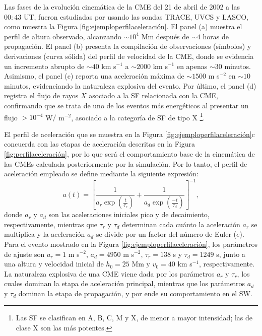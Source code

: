 Las fases de la evolución cinemática de la CME del 21 de abril de 2002 a las $00:43$ UT, fueron estudiadas por \textcite[][]{gallagher-2003, gallagher-2002} usando las sondas \ac{TRACE}, \ac{UVCS} y \ac{LASCO}, como muestra la Figura \ref{fig:ejemploperfilaceleración}. El panel (a) muestra el perfil de altura observado, alcanzando $\sim10^{4}$ Mm después de $\sim4$ horas de propagación. El panel (b) presenta la compilación de observaciones (símbolos) y derivaciones (curva sólida) del perfil de velocidad de la CME, donde se evidencia un incremento abrupto de $\sim40$ km s$^{-1}$ a $\sim2000$ km s$^{-1}$ en apenas $\sim30$ minutos. Asimismo, el panel (c) reporta una aceleración máxima de $\sim1500$ m s$^{-2}$ en $\sim10$ minutos, evidenciando la naturaleza explosiva del evento. Por último, el panel (d) registra el flujo de rayos $X$ asociado a la \ac{SF} relacionada con la CME, confirmando que se trata de uno de los eventos más energéticos al presentar un flujo $>10^{-4}$ W$/$ m$^{-2}$, asociado a la categoría de \ac{SF} de tipo X \footnote{Las SF se clasifican en A, B, C, M y X, de menor a mayor intensidad; las de clase X son las más potentes.}.

El perfil de aceleración que se muestra en la Figura \ref{fig:ejemploperfilaceleración}c concuerda con las etapas de aceleración descritas en la Figura \ref{fig:perfilaceleración}, por lo que será el comportamiento base de la cinemática de las CMEs calculada posteriormente por la simulación. Por lo tanto, el perfil de aceleración empleado se define mediante la siguiente expresión:
\begin{equation}
a(t)=\left[ \frac{1}{a_r\exp(\frac{t}{\tau_r})}+\frac{1}{a_d\exp(\frac{-t}{\tau_d})}\right]^{-1},
\label{ecuaceleración}
\end{equation}
donde $a_r$ y $a_d$ son las aceleraciones iniciales pico y de decaimiento, respectivamente, mientras que $\tau_r$ y $\tau_d$ determinan cada cuánto la aceleración $a_r$ se multiplica y la aceleración $a_d$ se divide por un factor del número de Euler ($e$). Para el evento mostrado en la Figura \ref{fig:ejemploperfilaceleración}, los parámetros de ajuste son $a_r=1$ m s$^{-2}$, $a_d=4950$ m s$^{-2}$, $\tau_r=138$ s y $\tau_d=1249$ s, junto a una altura y velocidad inicial de $h_0=25$ Mm y $v_0=40$ km s$^{-1}$, respectivamente. La naturaleza explosiva de una CME viene dada por los parámetros $a_r$ y $\tau_r$, los cuales dominan la etapa de aceleración principal, mientras que los parámetros $a_d$ y $\tau_d$ dominan la etapa de propagación, y por ende su comportamiento en el \ac{SW}.


